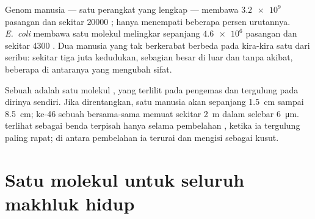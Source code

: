 \begin{example}\label{ex:g10:universal-dna:numbers}
Genom manusia --- satu perangkat  yang lengkap --- membawa
$\num{3.2e9}$ pasangan  dan sekitar $\num{20000}$ ;  hanya
menempati beberapa persen urutannya.  \emph{E.~coli} membawa satu
molekul  melingkar sepanjang $\num{4.6e6}$ pasangan  dan sekitar
4300 . Dua manusia yang tak berkerabat berbeda pada kira-kira satu
 dari seribu: sekitar tiga juta kedudukan, sebagian besar di luar
 dan tanpa akibat, beberapa di antaranya  yang mengubah sifat.
\end{example}

\begin{proposition}[Kromosom]\label{prop:g10:universal-dna:chromosome}
Sebuah  adalah satu molekul , yang terlilit pada 
pengemas dan tergulung pada dirinya sendiri. Jika direntangkan, 
satu  manusia akan sepanjang \qty{1.5}{cm} sampai \qty{8.5}{cm};
ke-46  sebuah  bersama-sama memuat sekitar \qty{2}{m} 
dalam  selebar \qty{6}{\micro m}.  terlihat sebagai
benda terpisah hanya selama pembelahan , ketika ia tergulung paling
rapat; di antara pembelahan ia terurai dan mengisi  sebagai kusut.
\end{proposition}
\admitted

\section{Satu molekul untuk seluruh makhluk hidup}

